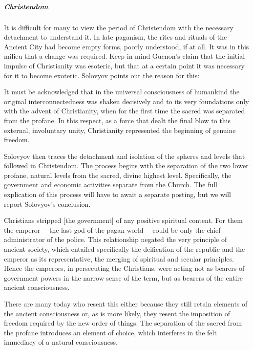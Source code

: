 \subparagraph{Christendom}
It is difficult for many to view the period of Christendom with the necessary detachment to understand it. In late paganism, the rites and rituals of the Ancient City had become empty forms, poorly understood, if at all. It was in this milieu that a change was required. Keep in mind Guenon's claim that the initial impulse of Christianity was esoteric, but that at a certain point it was necessary for it to become exoteric. Solovyov points out the reason for this:

\begin{quotex}
It must be acknowledged that in the universal consciousness of humankind the original interconnectedness was shaken decisively and to its very foundations only with the advent of Christianity, when for the first time the sacred was separated from the profane. In this respect, as a force that dealt the final blow to this external, involuntary unity, Christianity represented the beginning of genuine freedom.

\end{quotex}
Solovyov then traces the detachment and isolation of the spheres and levels that followed in Christendom. The process begins with the separation of the two lower profane, natural levels from the sacred, divine highest level. Specifically, the government and economic activities separate from the Church. The full explication of this process will have to await a separate posting, but we will report Solovyov's conclusion.

\begin{quotex}
Christians stripped [the government] of any positive spiritual content. For them the emperor —the last god of the pagan world— could be only the chief administrator of the police. This relationship negated the very principle of ancient society, which entailed specifically the deification of the republic and the emperor as its representative, the merging of spiritual and secular principles. Hence the emperors, in persecuting the Christians, were acting not as bearers of government powers in the narrow sense of the term, but as bearers of the entire ancient consciousness.

\end{quotex}
There are many today who resent this either because they still retain elements of the ancient consciousness or, as is more likely, they resent the imposition of freedom required by the new order of things. The separation of the sacred from the profane introduces an element of choice, which interferes in the felt immediacy of a natural consciousness.

